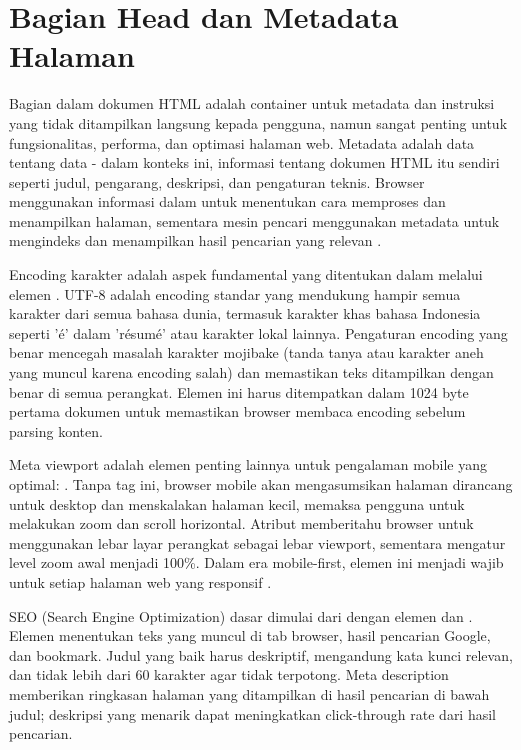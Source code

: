 \section{Bagian Head dan Metadata Halaman}

Bagian  dalam dokumen HTML adalah container untuk metadata dan instruksi yang tidak ditampilkan langsung kepada pengguna, namun sangat penting untuk fungsionalitas, performa, dan optimasi halaman web. Metadata adalah data tentang data - dalam konteks ini, informasi tentang dokumen HTML itu sendiri seperti judul, pengarang, deskripsi, dan pengaturan teknis. Browser menggunakan informasi dalam  untuk menentukan cara memproses dan menampilkan halaman, sementara mesin pencari menggunakan metadata untuk mengindeks dan menampilkan hasil pencarian yang relevan \cite{mdnHtmlIntro}.

Encoding karakter adalah aspek fundamental yang ditentukan dalam  melalui elemen . UTF-8 adalah encoding standar yang mendukung hampir semua karakter dari semua bahasa dunia, termasuk karakter khas bahasa Indonesia seperti 'é' dalam 'résumé' atau karakter lokal lainnya. Pengaturan encoding yang benar mencegah masalah karakter mojibake (tanda tanya atau karakter aneh yang muncul karena encoding salah) dan memastikan teks ditampilkan dengan benar di semua perangkat. Elemen  ini harus ditempatkan dalam 1024 byte pertama dokumen untuk memastikan browser membaca encoding sebelum parsing konten.

\begin{sloppypar}
Meta viewport adalah elemen penting lainnya untuk pengalaman mobile yang optimal: . Tanpa tag ini, browser mobile akan mengasumsikan halaman dirancang untuk desktop dan menskalakan halaman kecil, memaksa pengguna untuk melakukan zoom dan scroll horizontal. Atribut  memberitahu browser untuk menggunakan lebar layar perangkat sebagai lebar viewport, sementara  mengatur level zoom awal menjadi 100\%. Dalam era mobile-first, elemen ini menjadi wajib untuk setiap halaman web yang responsif \cite{webdevHtml}.
\end{sloppypar}

SEO (Search Engine Optimization) dasar dimulai dari  dengan elemen  dan . Elemen  menentukan teks yang muncul di tab browser, hasil pencarian Google, dan bookmark. Judul yang baik harus deskriptif, mengandung kata kunci relevan, dan tidak lebih dari 60 karakter agar tidak terpotong. Meta description memberikan ringkasan halaman yang ditampilkan di hasil pencarian di bawah judul; deskripsi yang menarik dapat meningkatkan click-through rate dari hasil pencarian.


